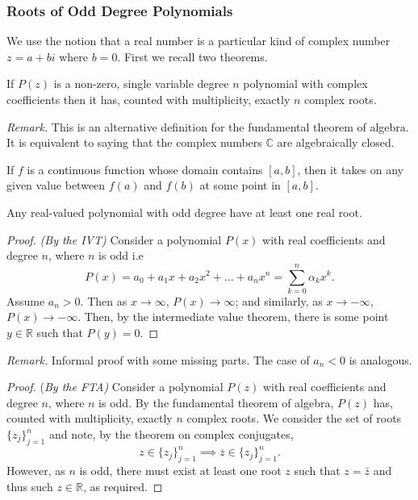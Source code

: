 \documentclass[12pt]{article}
\newcommand*\conj[1]{\overline{#1}}
\newcommand{\R}{\mathbb{R}}
\begin{document}
\subsubsection{Roots of Odd Degree Polynomials}
We use the notion that a real number is a particular kind of complex number $z = a + bi$ where $b = 0$. First we recall two theorems.
\begin{rcl}
If $P(z)$ is a non-zero, single variable degree $n$ polynomial with complex coefficients then it has, counted with multiplicity, exactly $n$ complex roots.
\end{rcl}
\textit{Remark.} This is an alternative definition for the fundamental theorem of algebra. It is equivalent to saying that the complex numbers $\mathbb{C}$ are algebraically closed.
\begin{rcl}
If $f$ is a continuous function whose domain contains $[a, b]$, then it takes on any given value between $f(a)$ and $f(b)$ at some point in $[a, b]$.
\end{rcl}
\begin{thm}
Any real-valued polynomial with odd degree have at least one real root.
\end{thm}
\begin{proof}
    \textit{(By the IVT)} Consider a polynomial $P(x)$ with real coefficients and degree $n$, where $n$ is odd i.e
    \begin{equation*}
        P(x) = a_0 + a_1x + a_2x^2 + \dots + a_nx^n = \sum_{k = 0}^n \alpha_kx^k.
    \end{equation*}
    Assume $a_n > 0$. Then as $x \rightarrow \infty$, $P(x) \rightarrow \infty$; and similarly, as $x \rightarrow -\infty$, $P(x) \rightarrow -\infty$. Then, by the intermediate value theorem, there is some point $y \in \R$ such that $P(y) = 0$.
\end{proof}
\textit{Remark.} Informal proof with some missing parts. The case of $a_n < 0$ is analogous.
\begin{proof}
    (\textit{By the FTA)} Consider a polynomial $P(z)$ with real coefficients and degree $n$, where $n$ is odd. By the fundamental theorem of algebra, $P(z)$ has, counted with multiplicity, exactly $n$ complex roots. We consider the set of roots $\{z_j\}_{j=1}^n$ and note, by the theorem on complex conjugates,
    \begin{equation*}
        z \in \{z_j\}_{j=1}^n \implies \conj{z} \in \{z_j\}_{j=1}^n.
    \end{equation*}
    However, as $n$ is odd, there must exist at least one root $z$ such that $z = \bar{z}$ and thus such $z \in \R$, as required.
\end{proof}
\end{document}
